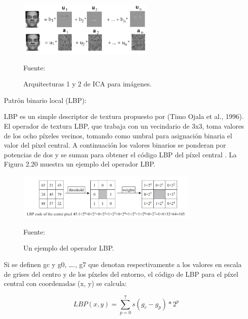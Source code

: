 \begin{enumerate}
\begin{figure}[ht]
\begin{center}
\includegraphics[width=0.6\textwidth]{Imagen20}
\end{center}
\begin{center}
\vskip -0.5cm
\caption{\small{Arquitecturas 1 y 2 de ICA para imágenes.}}
{\small{Fuente: \cite{Willian}}}
\end{center}
\end{figure}

\vskip 3cm

{\bf\item Patrón binario local (LBP):} \vskip 0.1cm
LBP es un simple descriptor de textura propuesto por (Timo Ojala et al., 1996). El operador de textura LBP, que trabaja con un vecindario de 3x3, toma valores de los ocho píxeles vecinos, tomando como umbral para asignación binaria el valor del píxel central. A continuación los valores binarios se ponderan por potencias de dos y se suman para obtener el código LBP del píxel central \citep{Adams}. La Figura 2.20 muestra un ejemplo del operador LBP.

\begin{figure}[ht]
\begin{center}
\includegraphics[width=0.8\textwidth]{Imagen21}
\end{center}
\begin{center}
\vskip -0.5cm
\caption{\small{Un ejemplo del operador LBP.}}
{\small{Fuente: \cite{Adams}}}
\end{center}
\end{figure}

Si se definen gc y g0, …., g7  que denotan respectivamente a los valores en escala de grises del centro y de los píxeles del entorno, el código de LBP para el píxel central con coordenadas (x, y) se calcula: 

\begin{equation}
LBP(x,y)=\sum_{p=0}^{7}s(g_{c}-g_{p})*2^{p}
\end{equation}


\end{enumerate}
